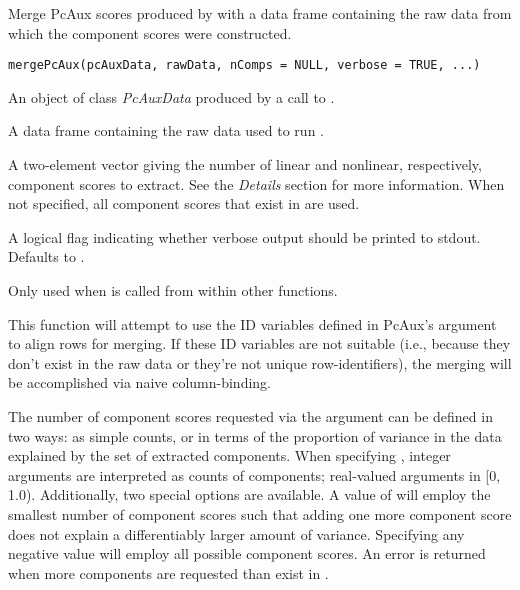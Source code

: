 \documentclass[letterpaper]{book}
\begin{document}
%
\begin{Description}\relax
Merge PcAux scores produced by  with a data frame
containing the raw data from which the component scores were
constructed.
\end{Description}
%
\begin{Usage}
\begin{verbatim}
mergePcAux(pcAuxData, rawData, nComps = NULL, verbose = TRUE, ...)
\end{verbatim}
\end{Usage}
%
\begin{Arguments}
\begin{ldescription}
\item[\code{pcAuxData}] 
An object of class \emph{PcAuxData} produced by a call to
.

\item[\code{rawData}] 
A data frame containing the raw data used to run
. 

\item[\code{nComps}] 
A two-element vector giving the number of linear and
nonlinear, respectively, component scores to extract. See the
\emph{Details} section for more information. When not specified, all
component scores that exist in  are used.

\item[\code{verbose}] 
A logical flag indicating whether verbose output should be printed
to stdout. Defaults to .

\item[\code{...}] 
Only used when  is called from within other
 functions.

\end{ldescription}
\end{Arguments}
%
\begin{Details}\relax
This function will attempt to use the ID variables defined in PcAux's
 argument to align rows for merging. If these ID
variables are not suitable (i.e., because they don't exist in the raw
data or they're not unique row-identifiers), the merging will be
accomplished via naive column-binding.

The number of component scores requested via the 
argument can be defined in two ways: as simple counts, or in terms of
the proportion of variance in the data explained by the set of
extracted components. When specifying , integer
arguments are interpreted as counts of components; real-valued
arguments in [0, 1.0). Additionally, two special options are available. A
value of  will employ the smallest number of component
scores such that adding one more component score does not explain a
differentiably larger amount of variance. Specifying any negative
value will employ all possible component scores. An error is returned
when more components are requested than exist in .  
\end{Details}
\end{document}
